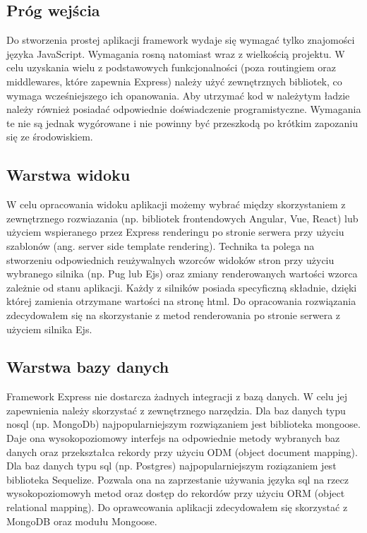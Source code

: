 \documentclass[12pt]{report}
\begin{document}
    \subsection{Próg wejścia}
      Do stworzenia prostej aplikacji framework wydaje się wymagać tylko znajomości języka JavaScript.
      Wymagania rosną natomiast wraz z wielkością projektu.
      W celu uzyskania wielu z podstawowych funkcjonalności (poza routingiem oraz middlewares, które zapewnia Express) należy użyć zewnętrznych bibliotek, co wymaga wcześniejszego ich opanowania. 
      Aby utrzymać kod w należytym ładzie należy również posiadać odpowiednie doświadczenie programistyczne.
      Wymagania te nie są jednak wygórowane i nie powinny być przeszkodą po krótkim zapozaniu się ze środowiskiem.

    \subsection{Warstwa widoku}
      W celu opracowania widoku aplikacji możemy wybrać między skorzystaniem z zewnętrznego rozwiazania (np. bibliotek frontendowych Angular, Vue, React) lub użyciem wspieranego przez Express renderingu po stronie serwera przy użyciu szablonów (ang. server side template rendering).
      Technika ta polega na stworzeniu odpowiednich reużywalnych wzorców widoków stron przy użyciu wybranego silnika (np. Pug lub Ejs) oraz zmiany renderowanych wartości wzorca zależnie od stanu aplikacji. 
      Każdy z silników posiada specyficzną składnie, dzięki której zamienia otrzymane wartości na stronę html.
      Do opracowania rozwiązania zdecydowałem się na skorzystanie z metod renderowania po stronie serwera z użyciem silnika Ejs.

    \subsection{Warstwa bazy danych}
      Framework Express nie dostarcza żadnych integracji z bazą danych. 
      W celu jej zapewnienia należy skorzystać z zewnętrznego narzędzia.
      Dla baz danych typu nosql (np. MongoDb) najpopularniejszym rozwiązaniem jest biblioteka mongoose.
      Daje ona wysokopoziomowy interfejs na odpowiednie metody wybranych baz danych oraz przekształca rekordy przy użyciu ODM (object document mapping).
      Dla baz danych typu sql (np. Postgres) najpopularniejszym roziązaniem jest biblioteka Sequelize.
      Pozwala ona na zaprzestanie używania języka sql na rzecz wysokopoziomowyh metod oraz dostęp do rekordów przy użyciu ORM (object relational mapping).
      Do oprawcowania aplikacji zdecydowałem się skorzystać z MongoDB oraz modułu Mongoose.
    \pagebreak
\end{document}

